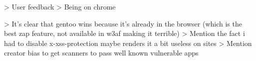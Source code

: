 > User feedback
> Being on chrome

> It's clear that gentoo wins because it's already in the browser (which is the best zap feature, not available in w3af making it terrible) 
> Mention the fact i had to disable x-xss-protection maybe renders it a bit useless on sites
> Mention creator bias to get scanners to pass well known vulnerable apps



































